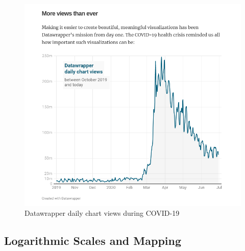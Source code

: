 \documentclass[print]{nuthesis}
\begin{document}
\begin{figure}[tbp]

{\centering \includegraphics[width=1\linewidth,]{images/covid19-datawrapper-views-july2020} 

}

\caption{Datawrapper daily chart views during COVID-19}\label{fig:covid19-datawrapper-views-july2020}
\end{figure}

\hypertarget{logarithmic-scales-and-mapping}{%
\subsection{Logarithmic Scales and Mapping}\label{logarithmic-scales-and-mapping}}
\end{document}
